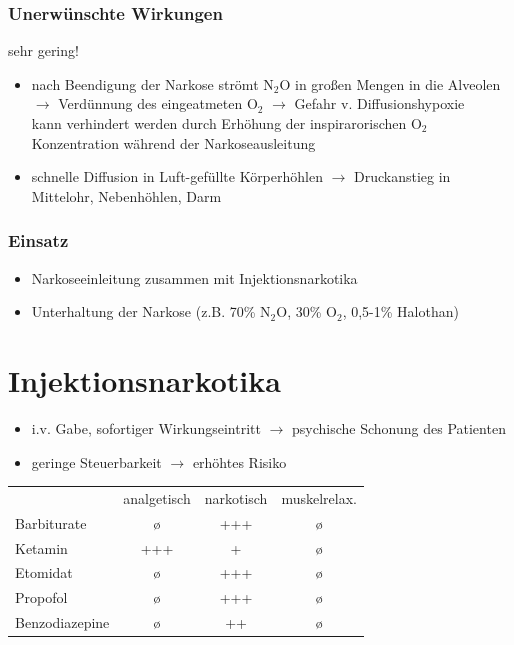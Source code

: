 \documentclass[10pt,a4paper]{report}
\begin{document}
\subsubsection{Unerwünschte Wirkungen} %
\label{ssub:unerw_nschte_wirkungen}
sehr gering!
\begin{itemize}
	\item nach Beendigung der Narkose strömt N$_2$O in großen Mengen in die Alveolen\\
	$\rightarrow$ Verdünnung des eingeatmeten O$_2$ $\rightarrow$ Gefahr v. Diffusionshypoxie \\ kann verhindert werden durch Erhöhung der inspirarorischen O$_2$ Konzentration während der Narkoseausleitung
	\item schnelle Diffusion in Luft-gefüllte Körperhöhlen $\rightarrow$ Druckanstieg in Mittelohr, Nebenhöhlen, Darm
\end{itemize}
\subsubsection{Einsatz} %
\label{ssub:einsatz}
\begin{itemize}
	\item Narkoseeinleitung zusammen mit Injektionsnarkotika
	\item Unterhaltung der Narkose (z.B. 70\% N$_2$O, 30\% O$_2$, 0,5-1\% Halothan)
\end{itemize}
\section{Injektionsnarkotika} %
\label{sec:injektionsnarkotika}
\begin{itemize}
	\item i.v. Gabe, sofortiger Wirkungseintritt  $\rightarrow$ psychische Schonung des Patienten
	\item geringe Steuerbarkeit $\rightarrow$ erhöhtes Risiko
\end{itemize}
\begin{tabularx}{\textwidth}{lccc}
&analgetisch&narkotisch&muskelrelax.\\                                 
Barbiturate&ø&+++&ø\\
Ketamin&+++&+&ø\\
Etomidat&ø&+++&ø\\
Propofol&ø&+++&ø\\
Benzodiazepine&ø&++&ø\\
\end{tabularx}
\end{document}

